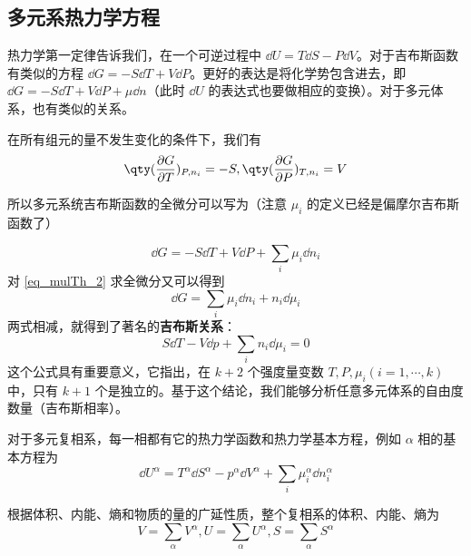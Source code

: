 \subsection{多元系热力学方程}
热力学第一定律告诉我们，在一个可逆过程中 $\dd U=T\dd S-P\dd V$。对于吉布斯函数有类似的方程 $\dd G=-S\dd T+V\dd P$。更好的表达是将化学势包含进去，即 $\dd G=-S\dd T+V\dd P+\mu\dd n$（此时 $\dd U$ 的表达式也要做相应的变换）。对于多元体系，也有类似的关系。

在所有组元的量不发生变化的条件下，我们有
\begin{equation}
\qty(\frac{\partial G}{\partial T})_{P,n_i}=-S,\qty(\frac{\partial G}{\partial P})_{T,n_i}=V
\end{equation}

所以多元系统吉布斯函数的全微分可以写为（注意 $\mu_i$ 的定义已经是偏摩尔吉布斯函数了）

\begin{equation}\label{eq_mulTh_3}
\dd G=-S\dd T+V\dd P+\sum_i\mu_i\dd n_i
\end{equation}
对 \autoref{eq_mulTh_2} 求全微分又可以得到
\begin{equation}
\dd G=\sum_i\mu_i\dd n_i+n_i\dd \mu_i
\end{equation}
两式相减，就得到了著名的\textbf{吉布斯关系}：
\begin{equation}
S\dd T-V\dd p+\sum_i n_i\dd \mu_i=0
\end{equation}
这个公式具有重要意义，它指出，在 $k+2$ 个强度量变数 $T,P,\mu_i(i=1,\cdots,k)$ 中，只有 $k+1$ 个是独立的。基于这个结论，我们能够分析任意多元体系的自由度数量（吉布斯相率）。

对于多元复相系，每一相都有它的热力学函数和热力学基本方程，例如 $\alpha$ 相的基本方程为
\begin{equation}
\dd U^\alpha=T^\alpha\dd S^\alpha-p^\alpha\dd V^\alpha+\sum_i\mu_i^\alpha\dd n_i^\alpha
\end{equation}

根据体积、内能、熵和物质的量的广延性质，整个复相系的体积、内能、熵为
\begin{equation}
V=\sum_\alpha V^\alpha,U=\sum_\alpha U^\alpha,S=\sum_\alpha S^\alpha
\end{equation}
